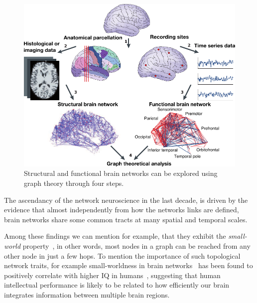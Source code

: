 \begin{figure}[htb!]
\centering
\includegraphics[width=1.0\textwidth]{images/bullmore_2009_pipeline.pdf}
\caption{Structural and functional brain networks can be explored using graph theory through four steps.}
\label{fig:bullmore2009pipeline}
\end{figure}

The ascendancy of the network neuroscience in the last decade, is driven by the evidence that almost independently from how the networks links are defined, brain networks share some common tracts at many spatial and temporal scales.

Among these findings we can mention for example, that they exhibit the \emph{small-world} property~\cite{watts1998,sporns2002,sporns2004a}, in other words, most nodes in a graph can be reached from any other node in just a few hops. To mention the importance of such topological network traits, for example small-worldness in brain networks~\cite{vandenheuvel2008} has been found to positively correlate with higher IQ in humans~\cite{vandenheuvel2009}, suggesting that human intellectual performance is likely to be related to how efficiently our brain integrates information between multiple brain regions.

